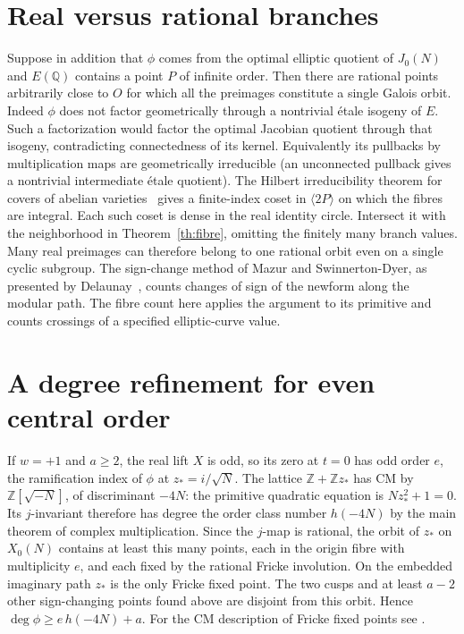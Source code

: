 \documentclass[11pt]{article}
\begin{document}
\section*{Real versus rational branches}
Suppose in addition that $\phi$ comes from the optimal elliptic quotient
of $J_0(N)$ and $E(\mathbb Q)$ contains a point $P$ of infinite order.
Then there are rational points arbitrarily close to $O$ for which
all the preimages constitute a single Galois orbit. Indeed $\phi$
does not factor geometrically through a nontrivial \'etale isogeny
of $E$. Such a factorization would factor the optimal Jacobian
quotient through that isogeny, contradicting connectedness of its
kernel. Equivalently its pullbacks by multiplication maps are
geometrically irreducible (an unconnected pullback gives a nontrivial
intermediate \'etale quotient). The Hilbert irreducibility theorem
for covers of abelian varieties~\cite[Theorem 1.4]{CDJLZ} gives a
finite-index coset in $\langle 2P\rangle$ on which the fibres are
integral. Each such coset is dense in the real identity circle.
Intersect it with the neighborhood in Theorem~\ref{th:fibre}, omitting
the finitely many branch values. Many real preimages can therefore
belong to one rational orbit even on a single cyclic subgroup.
The sign-change method of Mazur and Swinnerton-Dyer, as presented by
Delaunay~\cite{D}, counts changes of sign of the newform along the
modular path. The fibre count here applies the argument to its
primitive and counts crossings of a specified elliptic-curve value.
\section*{A degree refinement for even central order}
If $w=+1$ and $a\ge2$, the real lift $X$ is odd, so its zero at
$t=0$ has odd order $e$, the ramification index of $\phi$ at
$z_*=i/\sqrt N$. The lattice $\mathbb Z+\mathbb Z z_*$ has CM by
$\mathbb Z[\sqrt{-N}]$, of discriminant $-4N$: the primitive quadratic
equation is $Nz_*^2+1=0$. Its $j$-invariant therefore has degree the
order class number $h(-4N)$ by the main theorem of complex multiplication.
Since the $j$-map is rational, the orbit of $z_*$ on $X_0(N)$ contains
at least this many points, each in the origin fibre with multiplicity
$e$, and each fixed by the rational Fricke involution. On the embedded
imaginary path $z_*$ is the only Fricke fixed point. The two cusps
and at least $a-2$ other sign-changing points found above are disjoint
from this orbit. Hence $\deg\phi\ge e\,h(-4N)+a$. For the CM description
of Fricke fixed points see \cite[\S5]{Oz}.
\end{document}
